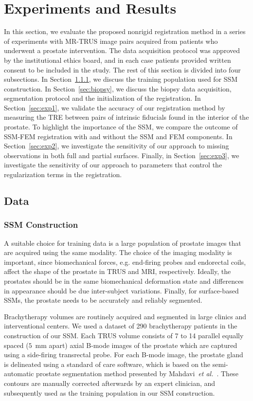\documentclass[journal]{IEEEtran}
\begin{document}
\section{Experiments and Results}
In this section, we evaluate the proposed nonrigid registration method in a series of experiments with MR-TRUS image pairs acquired from patients who underwent a prostate intervention. The data acquisition protocol was approved by the institutional ethics board, and in each case patients provided written consent to be included in the study. The rest of this section is divided into four subsections. In Section~\ref{sec:ssm}, we discuss the training population used for SSM construction. In Section~\ref{sec:biopsy}, we discuss the biopsy data acquisition, segmentation protocol and the initialization of the registration. In Section~\ref{sec:exp1}, we validate the accuracy of our registration method by measuring the TRE between pairs of intrinsic fiducials found in the interior of the prostate. To highlight the importance of the SSM, we compare the outcome of SSM-FEM registration with and without the SSM and FEM components. In Section~\ref{sec:exp2}, we investigate the sensitivity of our approach to missing observations in both full and partial surfaces. Finally, in Section~\ref{sec:exp3}, we investigate the sensitivity of our approach to parameters that control the regularization terms in the registration.
\subsection{Data}
\subsubsection{SSM Construction}\label{sec:ssm}
A suitable choice for training data is a large population of prostate images that are acquired using the same modality. The choice of the imaging modality is important, since biomechanical forces, e.g. end-firing probes and endorectal coils, affect the shape of the prostate in TRUS and MRI, respectively. Ideally, the prostates should be in the same biomechanical deformation state and differences in appearance should be due inter-subject variations. Finally, for surface-based SSMs, the prostate needs to be accurately and reliably segmented.

Brachytherapy volumes are routinely acquired and segmented in large clinics and interventional centers. We used a dataset of 290 brachytherapy patients in the construction of our SSM. Each TRUS volume consists of 7 to 14 parallel equally spaced ($5$~mm apart) axial B-mode images of the prostate which are captured using a side-firing transrectal probe. For each B-mode image, the prostate gland is delineated using a standard of care software, which is based on the semi-automatic prostate segmentation method presented by Mahdavi~\textit{et al.}~\cite{Mahdavi11a}. These contours are manually corrected afterwards by an expert clinician, and subsequently used as the training population in our SSM construction.
\end{document}
